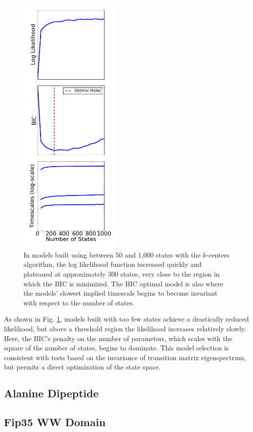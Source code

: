 \documentclass[twocolumn,floatfix,nofootinbib,aps]{revtex4-1}
\begin{document}
\begin{figure}[h]
\centering
\includegraphics[width=2in]{figs/like_comp.png}
\caption{In models built using between 50 and 1,000 states with the $k$-centers algorithm, the log likelihood function increased quickly and plateaued at approximately 300 states, very close to the region in which the BIC is minimized. The BIC optimal model is also where the models' slowest implied timescals begins to become invariant with respect to the number of states.}
\label{fig:mullerlike}
\end{figure}

As shown in Fig. \ref{fig:mullerlike}, models built with too few states achieve a drastically reduced likelihood, but above a threshold region the likelihood increases relatively slowly. Here, the BIC's penalty on the number of parameters, which scales with the square of the number of states, begins to dominate. This model selection is consistent with tests based on the invariance of transition matrix eigenspectrum, but permits a direct optimization of the state space.

\subsection{Alanine Dipeptide}

\subsection{Fip35 WW Domain}
\end{document}
